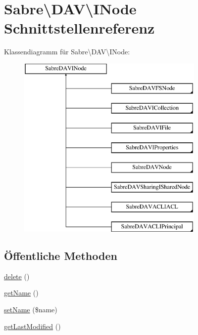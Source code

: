 \hypertarget{interface_sabre_1_1_d_a_v_1_1_i_node}{}\section{Sabre\textbackslash{}D\+AV\textbackslash{}I\+Node Schnittstellenreferenz}
\label{interface_sabre_1_1_d_a_v_1_1_i_node}
Klassendiagramm für Sabre\textbackslash{}D\+AV\textbackslash{}I\+Node\+:\begin{figure}[H]
\begin{center}
\leavevmode
\includegraphics[height=9.000000cm]{interface_sabre_1_1_d_a_v_1_1_i_node}
\end{center}
\end{figure}
\subsection*{Öffentliche Methoden}
\begin{DoxyCompactItemize}
\item 
\mbox{\hyperlink{interface_sabre_1_1_d_a_v_1_1_i_node_a72cd0ee4e36dfced2b0412d14dbd73e6}{delete}} ()
\item 
\mbox{\hyperlink{interface_sabre_1_1_d_a_v_1_1_i_node_ab616fe836b1ae36af12126a2bc934dce}{get\+Name}} ()
\item 
\mbox{\hyperlink{interface_sabre_1_1_d_a_v_1_1_i_node_ac90fa5526e98def2e1f51bc57a772366}{set\+Name}} (\$name)
\item 
\mbox{\hyperlink{interface_sabre_1_1_d_a_v_1_1_i_node_a06335f81c7d4ec2c6d9e327c8ce61014}{get\+Last\+Modified}} ()
\end{DoxyCompactItemize}


